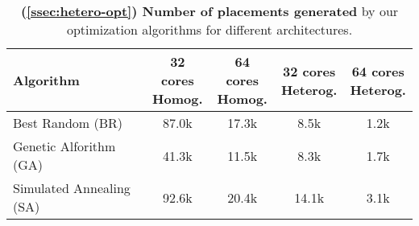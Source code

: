 \setcounter{table}{4}
\begin{table}[H]
\setlength{\tabcolsep}{5pt}
\centering
\captionsetup{justification=centering}
\begin{tabular}{lcccc}
\hline
Algorithm					& \makecell{32 cores\\Homog.}		& \makecell{64 cores\\Homog.} 	& \makecell{32 cores\\Heterog.} 	& \makecell{64 cores\\Heterog.}
\vspace{-0.3em}\\
\midrule
Best Random (BR)			& 87.0k 							& 17.3k							& 8.5k							& 1.2k					\\
Genetic Alforithm (GA)		& 41.3k								& 11.5k							& 8.3k							& 1.7k					\\
Simulated Annealing (SA)	& 92.6k								& 20.4k							& 14.1k							& 3.1k					\\
\hline
\end{tabular}
\caption{\textbf{(\textsection \ref{ssec:hetero-opt}) Number of placements generated} by our optimization algorithms for different architectures.}
\label{tab:hetero-ninstance}
\end{table}
\vspace{-1em}
\setcounter{table}{6}


